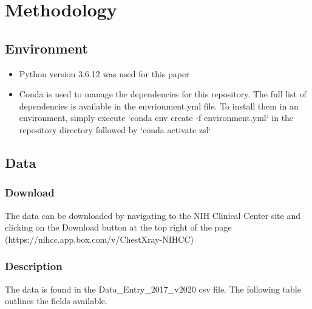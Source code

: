 \documentclass[letterpaper]{article} %
\begin{document}
\section{Methodology}

\subsection{Environment}
\begin{itemize}
    \item Python version 3.6.12 was used for this paper
    \item Conda is used to manage the dependencies for this repository. The full list of dependencies is available in the envrionment.yml file. To install them in an environment, simply execute `conda env create -f environment.yml` in the repository directory followed by `conda activate zsl`
\end{itemize}

\subsection{Data}

\subsubsection{Download}
The data can be downloaded by navigating to the NIH Clinical Center site and clicking on the Download button at the top right of the page (https://nihcc.app.box.com/v/ChestXray-NIHCC)

\subsubsection{Description}
The data is found in the Data\_Entry\_2017\_v2020 csv file. The following table outlines the fields available.


\newblock
\end{document}

